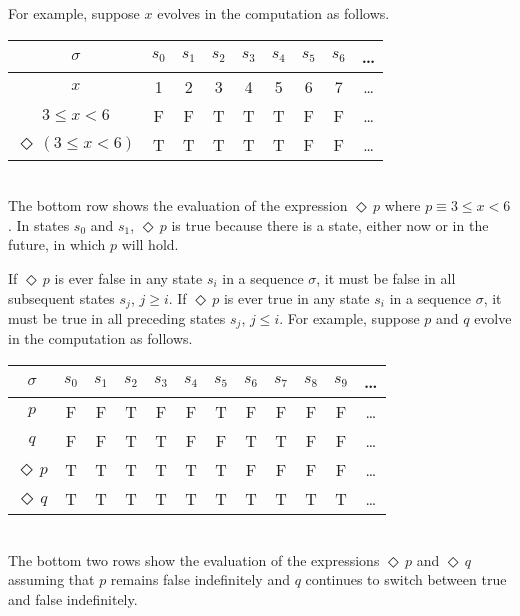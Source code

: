 \documentclass[12pt, fleqn, leqno]{article}
\newcommand{\lllgap}{12pt}                          %
\newcommand{\Event}{\Diamond\,}
\begin{document}
For example, suppose $x$ evolves in the computation as follows.\\[\lllgap]
\begin{tabular}{c|cccccccc}
  $\sigma$                  & $s_0$ & $s_1$ & $s_2$ & $s_3$ & $s_4$ & $s_5$ & $s_6$ & \dots \\
  \hline
  $x$                       & 1     & 2     & 3     & 4     & 5     & 6     & 7     &  \dots\\
  $3\le x<6$                & F     & F     & T     & T     & T     & F     & F     &  \dots\\
  $\Event(3\le x<6)$        & T     & T     & T     & T     & T     & F     & F     &  \dots\\
\end{tabular}\\[\lllgap]
The bottom row shows the evaluation of the expression $\Event p$ where $p\equiv 3\le x<6$.
In states $s_0$ and $s_1$, $\Event p$ is true because there is a state, either now or in the future, in which $p$ will hold.

If $\Event p$ is ever false in any state $s_i$ in a sequence $\sigma$, it must be false in all subsequent states $s_j$, $j\ge i$.
If $\Event p$ is ever true in any state $s_i$ in a sequence $\sigma$, it must be true in all preceding states $s_j$, $j\le i$.
For example, suppose $p$ and $q$ evolve in the computation as follows.\\[\lllgap]
\begin{tabular}{c|ccccccccccc}
  $\sigma$       & $s_0$ & $s_1$ & $s_2$ & $s_3$ & $s_4$ & $s_5$ & $s_6$ & $s_7$ & $s_8$& $s_9$  & \dots \\
  \hline
  $p$            & F     & F     & T     & F     & F     & T     & F     & F     & F     & F     &  \dots\\
  $q$            & F     & F     & T     & T     & F     & F     & T     & T     & F     & F     &  \dots\\
  $\Event p$     & T     & T     & T     & T     & T     & T     & F     & F     & F     & F     &  \dots\\
  $\Event q$     & T     & T     & T     & T     & T     & T     & T     & T     & T     & T     &  \dots\\
\end{tabular}\\[\lllgap]
The bottom two rows show the evaluation of the expressions $\Event p$ and $\Event q$
assuming that $p$ remains false indefinitely and $q$ continues to switch between true and false indefinitely.
\end{document}
